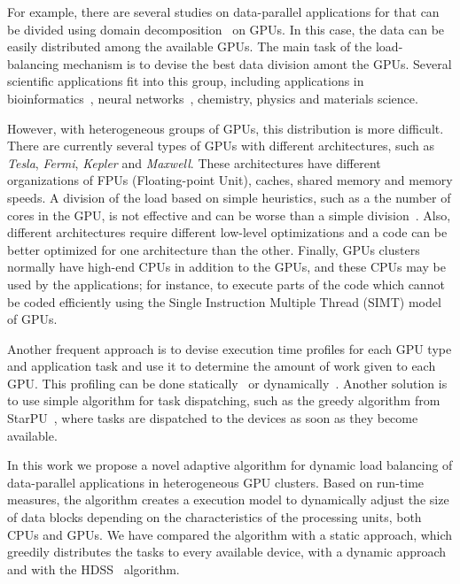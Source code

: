 \documentclass[journal]{IEEEtran}
\begin{document}
For example, there are several studies on
data-parallel applications for that can be divided using domain
decomposition~\cite{Gropp:1992uq} on GPUs. In this case, the data can be easily distributed
among the available GPUs. The main task of the load-balancing mechanism is to
devise the best data division amont the GPUs.  Several scientific applications fit
into this group, including applications in bioinformatics~\cite{bioinformatica2},
neural networks~\cite{neural}, chemistry, physics and materials science.

However, with heterogeneous groups of GPUs, this distribution is more
difficult. There are currently several types of GPUs with different
architectures, such as \emph{Tesla},​ \emph{Fermi}, \emph{Kepler} and
\emph{Maxwell}. These architectures have different organizations of FPUs
(Floating-point Unit), caches, shared memory and memory speeds. A division of the
load based on simple heuristics, such as a the number of cores in the GPU, is
not effective and can be worse than a simple division~\cite{raphael}. Also, 
different architectures require different low-level optimizations and a code can be better
optimized for one architecture than the other. Finally, GPUs clusters normally
have high-end CPUs in addition to the GPUs, and these CPUs may be used by the
applications; for instance, to execute parts of the code which cannot be coded
efficiently using the Single Instruction Multiple Thread (SIMT) model of GPUs.

Another frequent approach is to devise execution time profiles for each GPU type and application task and use it to determine the amount of work given to each GPU. This profiling can be
done statically~\cite{raphael} or dynamically~\cite{acosta, HDSS}. Another
solution is to use simple algorithm for task dispatching, such as the greedy
algorithm from StarPU~\cite{starpu}, where tasks are dispatched to the devices
as soon as they become available.

In this work we propose a novel adaptive algorithm for dynamic load
balancing of data-parallel applications in heterogeneous GPU
clusters. Based on run-time measures, the algorithm creates a execution
model to dynamically adjust the size of data blocks depending on the characteristics of the processing units, both CPUs and GPUs. We have compared the algorithm with a static
approach, which greedily distributes the tasks to every available
device,  with a dynamic approach and with the HDSS~\cite{HDSS} algorithm.

% 
% 
% 
% 
\end{document}
